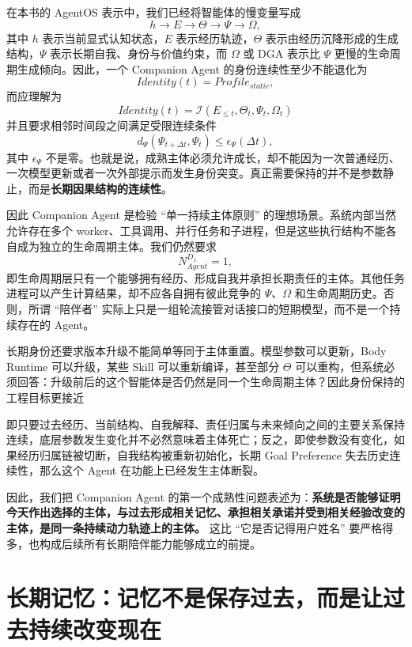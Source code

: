 在本书的 AgentOS 表示中，我们已经将智能体的慢变量写成
\[
h
\rightarrow
E
\rightarrow
\Theta
\rightarrow
\Psi
\rightarrow
\Omega ,
\]
其中 $h$ 表示当前显式认知状态，$E$ 表示经历轨迹，$\Theta$ 表示由经历沉降形成的生成结构，$\Psi$ 表示长期自我、身份与价值约束，而 $\Omega$ 或 DGA 表示比 $\Psi$ 更慢的生命周期生成倾向。因此，一个 Companion Agent 的身份连续性至少不能退化为
\[
Identity(t)=Profile_{static},
\]
而应理解为
\[
\boxed{
Identity(t)
=
\mathcal I
\left(
E_{\leq t},
\Theta_t,
\Psi_t,
\Omega_t
\right)
}
\]
并且要求相邻时间段之间满足受限连续条件
\[
d_{\Psi}
\left(
\Psi_{t+\Delta t},
\Psi_t
\right)
\leq
\epsilon_{\Psi}(\Delta t),
\]
其中 $\epsilon_{\Psi}$ 不是零。也就是说，成熟主体必须允许成长，却不能因为一次普通经历、一次模型更新或者一次外部提示而发生身份突变。真正需要保持的并不是参数静止，而是\textbf{长期因果结构的连续性}。

因此 Companion Agent 是检验 ``单一持续主体原则'' 的理想场景。系统内部当然允许存在多个 worker、工具调用、并行任务和子进程，但是这些执行结构不能各自成为独立的生命周期主体。我们仍然要求
\[
N^{D_1}_{Agent}=1,
\]
即生命周期层只有一个能够拥有经历、形成自我并承担长期责任的主体。其他任务进程可以产生计算结果，却不应各自拥有彼此竞争的 $\Psi$、$\Omega$ 和生命周期历史。否则，所谓 ``陪伴者'' 实际上只是一组轮流接管对话接口的短期模型，而不是一个持续存在的 Agent。

长期身份还要求版本升级不能简单等同于主体重置。模型参数可以更新，Body Runtime 可以升级，某些 Skill 可以重新编译，甚至部分 $\Theta$ 可以重构，但系统必须回答：升级前后的这个智能体是否仍然是同一个生命周期主体？因此身份保持的工程目标更接近
\begin{statementbox}
\centering
{}
\end{statementbox}
即只要过去经历、当前结构、自我解释、责任归属与未来倾向之间的主要关系保持连续，底层参数发生变化并不必然意味着主体死亡；反之，即使参数没有变化，如果经历归属链被切断，自我结构被重新初始化，长期 Goal Preference 失去历史连续性，那么这个 Agent 在功能上已经发生主体断裂。

因此，我们把 Companion Agent 的第一个成熟性问题表述为：\textbf{系统是否能够证明今天作出选择的主体，与过去形成相关记忆、承担相关承诺并受到相关经验改变的主体，是同一条持续动力轨迹上的主体。} 这比 ``它是否记得用户姓名'' 要严格得多，也构成后续所有长期陪伴能力能够成立的前提。

\section{长期记忆：记忆不是保存过去，而是让过去持续改变现在}


